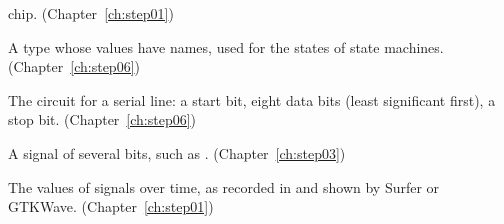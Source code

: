 \begin{description}
  chip. (Chapter~\ref{ch:step01})
\item[\cc{typedef enum}] A type whose values have names, used for the states
  of state machines. (Chapter~\ref{ch:step06})
\item[UART] The circuit for a serial line: a start bit, eight data bits (least
  significant first), a stop bit. (Chapter~\ref{ch:step06})
\item[Vector] A signal of several bits, such as .
  (Chapter~\ref{ch:step03})
\item[Waveform] The values of signals over time, as recorded in
   and shown by Surfer or GTKWave. (Chapter~\ref{ch:step01})
\end{description}
